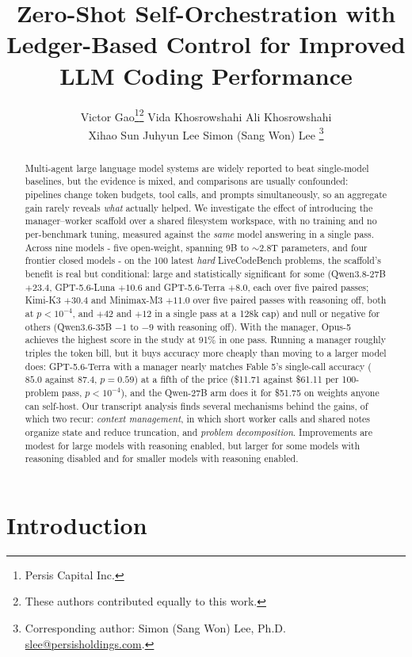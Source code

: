 \documentclass[11pt]{article}
\title{\bfseries Zero-Shot Self-Orchestration with Ledger-Based Control for Improved LLM Coding Performance}
\author{%
  Victor Gao\thanks{Persis Capital Inc.}\hspace{0.35em}\thanks{These authors contributed equally to this work.}\quad
  Vida Khosrowshahi\footnotemark[1]\hspace{0.35em}\footnotemark[2]\quad
  Ali Khosrowshahi\footnotemark[1]\hspace{0.35em}\footnotemark[2]\\[0.4ex]
  Xihao Sun\footnotemark[1]\quad
  Juhyun Lee\quad
  Simon (Sang Won) Lee\footnotemark[1]\hspace{0.35em}%
  \thanks{Corresponding author: Simon (Sang Won) Lee, Ph.D.
     \href{mailto:slee@persisholdings.com}{slee@persisholdings.com}.}
}
\date{}
\begin{document}
\maketitle

\begin{abstract}
\noindent
Multi-agent large language model systems are widely reported to beat single-model
baselines, but the
evidence is mixed, and comparisons are usually confounded: pipelines change token budgets,
tool calls, and prompts simultaneously, so an aggregate gain rarely reveals \textit{what} actually
helped. We investigate the effect of introducing the manager–worker scaffold
over a shared filesystem workspace, with no training and no per-benchmark tuning,
measured against the \textit{same} model answering in a single pass. Across nine models
- five open-weight, spanning 9B to ${\sim}2.8$T parameters, and four frontier closed
models - on the 100 latest \textit{hard} LiveCodeBench problems, the scaffold's benefit
is real but conditional: large and statistically significant for some (Qwen3.8-27B
$+23.4$, GPT-5.6-Luna $+10.6$ and GPT-5.6-Terra $+8.0$, each over five paired passes; Kimi-K3 $+30.4$ and
Minimax-M3 $+11.0$ over five paired passes with reasoning off, both at $p < 10^{-4}$, and
$+42$ and $+12$ in a single pass at a 128k cap)
and null or negative for others (Qwen3.6-35B $-1$ to $-9$ with reasoning off). With the
manager, Opus-5 achieves the highest score in the study at 91\% in one pass. Running a manager roughly triples the token bill, but it buys
accuracy more cheaply than moving to a larger model does: GPT-5.6-Terra with a manager
nearly matches Fable 5's single-call accuracy ($85.0$ against $87.4$, $p = 0.59$) at a fifth of the
price (\$11.71 against \$61.11 per 100-problem pass, $p < 10^{-4}$), and the Qwen-27B arm does it
for \$51.75 on weights anyone can self-host. Our transcript analysis finds several
mechanisms behind the gains, of which two recur: \textit{context
management}, in which short worker calls and shared notes organize state and reduce
truncation, and \textit{problem decomposition}. Improvements are modest for large models
with reasoning enabled, but larger for some models with reasoning disabled and for smaller
models with reasoning enabled.
\end{abstract}

\section{Introduction}
\end{document}
